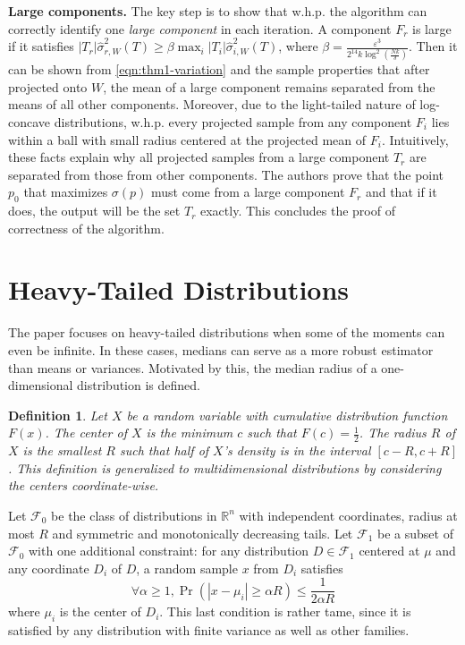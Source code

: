 \documentclass[11pt,letter]{article}
\newtheorem{definition}{Definition}
\begin{document}
\textbf{Large components.}
The key step is to show that w.h.p. the algorithm can correctly identify one \emph{large component} in each iteration. A component $F_r$ is large if it satisfies $|T_r| \hat \sigma_{r, W}^2(T) \ge \beta \max_i|T_i| \hat \sigma_{i, W}^2(T)$, where $\beta = \frac{\varepsilon^3}{2^{14}k \log^2(\frac{Nk}{\delta})}$. Then it can be shown from \eqref{eqn:thm1-variation} and the sample properties that after projected onto $W$, the mean of a large component remains separated from the means of all other components.
Moreover, due to the light-tailed nature of log-concave distributions, w.h.p. every projected sample from any component $F_i$ lies within a ball with small radius centered at the projected mean of $F_i$. Intuitively, these facts explain why all projected samples from a large component $T_r$ are separated from those from other components. The authors prove that the point $p_0$ that maximizes $\sigma(p)$ must come from a large component $F_r$ and that if it does, the output will be the set $T_r$ exactly. This concludes the proof of correctness of the algorithm.





\section{Heavy-Tailed Distributions}

The paper \cite{Dasgupta05heavy-tail} focuses on heavy-tailed distributions when some of the  moments can even be infinite. In these cases, medians can serve as a more robust estimator than means or variances. Motivated by this, the median radius of a one-dimensional distribution is defined. 

\begin{definition}
Let $X$ be a random variable with cumulative distribution function $F(x)$. The center of $X$ is the minimum $c$ such that $F(c) = \frac{1}{2}$. The radius $R$ of $X$ is the smallest $R$ such that half of $X$'s density is in the interval $[c-R, c+R]$. This definition is generalized to multidimensional distributions by considering the centers coordinate-wise. 
\end{definition}

Let $\mathcal F_0$ be the class of distributions in $\mathbb{R}^n$ with independent coordinates, radius at most $R$ and symmetric and monotonically decreasing tails. Let $\mathcal F_1$ be a subset of $\mathcal F_0$ with one additional constraint: for any distribution $D \in \mathcal F_1$ centered at ${\mu}$ and any coordinate $D_i$ of $D$, a random sample $x$ from $D_i$ satisfies 
$$ \forall \alpha \geq 1, \Pr{(|x-\mu_i| \geq \alpha R)} \leq \frac{1}{2\alpha R}$$
where $\mu_i$ is the center of $D_i$.
This last condition is rather tame, since it is satisfied by any distribution with finite variance as well as other families.
\end{document}
